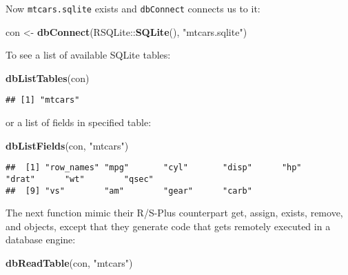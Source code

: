 \documentclass[]{book}
\newenvironment{Shaded}{\begin{snugshade}}{\end{snugshade}}
\newcommand{\KeywordTok}[1]{\textcolor[rgb]{0.13,0.29,0.53}{\textbf{{#1}}}}
\newcommand{\StringTok}[1]{\textcolor[rgb]{0.31,0.60,0.02}{{#1}}}
\newcommand{\NormalTok}[1]{{#1}}
\begin{document}
Now \texttt{mtcars.sqlite} exists and \texttt{dbConnect} connects us to
it:

\begin{Shaded}
\begin{Highlighting}[]
\NormalTok{con <-}\StringTok{ }\KeywordTok{dbConnect}\NormalTok{(RSQLite::}\KeywordTok{SQLite}\NormalTok{(), }\StringTok{"mtcars.sqlite"}\NormalTok{)}
\end{Highlighting}
\end{Shaded}

To see a list of available SQLite tables:

\begin{Shaded}
\begin{Highlighting}[]
\KeywordTok{dbListTables}\NormalTok{(con)}
\end{Highlighting}
\end{Shaded}

\begin{verbatim}
## [1] "mtcars"
\end{verbatim}

or a list of fields in specified table:

\begin{Shaded}
\begin{Highlighting}[]
\KeywordTok{dbListFields}\NormalTok{(con, }\StringTok{"mtcars"}\NormalTok{)}
\end{Highlighting}
\end{Shaded}

\begin{verbatim}
##  [1] "row_names" "mpg"       "cyl"       "disp"      "hp"        "drat"      "wt"        "qsec"     
##  [9] "vs"        "am"        "gear"      "carb"
\end{verbatim}

The next function mimic their R/S-Plus counterpart get, assign, exists,
remove, and objects, except that they generate code that gets remotely
executed in a database engine:

\begin{Shaded}
\begin{Highlighting}[]
\KeywordTok{dbReadTable}\NormalTok{(con, }\StringTok{"mtcars"}\NormalTok{)}
\end{Highlighting}
\end{Shaded}
\end{document}
